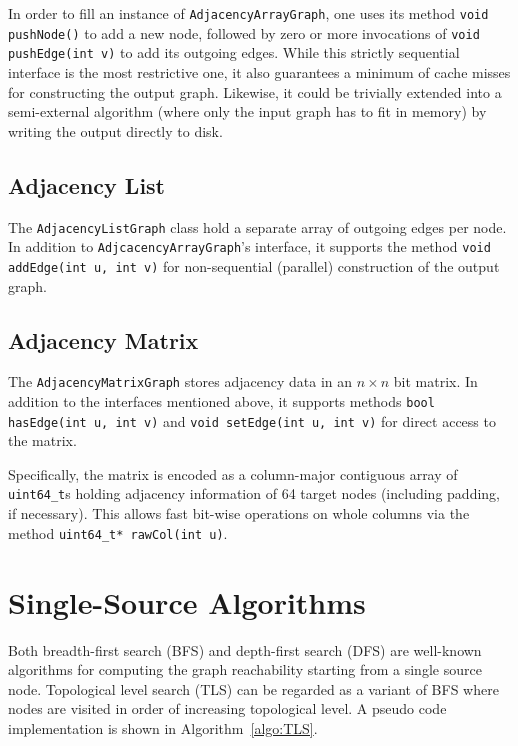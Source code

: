\documentclass[12pt,a4paper,twoside]{article}
\begin{document}
In order to fill an instance of \verb|AdjacencyArrayGraph|, one uses its method \verb|void pushNode()| to add a new node, followed by zero or more invocations of \verb|void pushEdge(int v)| to add its outgoing edges. While this strictly sequential interface is the most restrictive one, it also guarantees a minimum of cache misses for constructing the output graph. Likewise, it could be trivially extended into a semi-external algorithm (where only the input graph has to fit in memory) by writing the output directly to disk.

\subsection{Adjacency List}

The \verb|AdjacencyListGraph| class hold a separate array of outgoing edges per node. In addition to \verb|AdjcacencyArrayGraph|'s interface, it supports the method \verb|void addEdge(int u, int v)| for non-sequential (\eg parallel) construction of the output graph.

\subsection{Adjacency Matrix}

The \verb|AdjacencyMatrixGraph| stores adjacency data in an $n \times n$ bit matrix. In addition to the interfaces mentioned above, it supports methods \verb|bool hasEdge(int u, int v)| and \verb|void setEdge(int u, int v)| for direct access to the matrix.

Specifically, the matrix is encoded as a column-major contiguous array of \verb|uint64_t|s holding adjacency information of 64 target nodes (including padding, if necessary). This allows fast bit-wise operations on whole columns via the method \verb|uint64_t* rawCol(int u)|.

\section{Single-Source Algorithms}

Both breadth-first search (BFS) and depth-first search (DFS) are well-known algorithms for computing the graph reachability starting from a single source node. Topological level search (TLS) can be regarded as a variant of BFS where nodes are visited in order of increasing topological level. A pseudo code implementation is shown in Algorithm~\ref{algo:TLS}.
\end{document}
